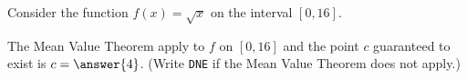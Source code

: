 \documentclass{ximera}
\author{Nela Lakos \and Kyle Parsons}
\begin{document}
\begin{exercise}

Consider the function $f(x) = \sqrt{x}$ on the interval $[0,16]$.


The Mean Value Theorem  apply to $f$ on $[0,16]$ and the point $c$ guaranteed to exist is $c=\answer{4}$. (Write \verb|DNE| if the Mean Value Theorem does not apply.)

\end{exercise}
\end{document}
